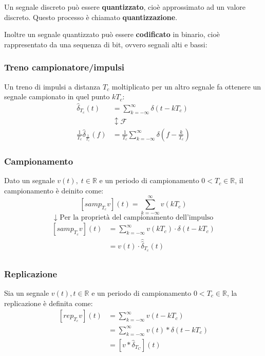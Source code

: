\documentclass[a4paper]{article}
\begin{document}
\noindent
Un segnale discreto può essere \textbf{quantizzato}, cioè approssimato ad un valore
discreto. Questo processo è chiamato \textbf{quantizzazione}.

Inoltre un segnale quantizzato può essere \textbf{codificato} in binario, cioè rappresentato
da una sequenza di bit, ovvero segnali alti e bassi:
\label{16-01-D3}

\subsubsection{Treno campionatore/impulsi}
Un treno di impulsi a distanza \( T_c \) moltiplicato per un altro segnale fa ottenere
un segnale campionato in quel punto \( kT_c \):
\label{16-01-D4}
\[
  \begin{aligned}
    \hat{\delta}_{T_c}(t) &= \sum_{k = -\infty}^{\infty} \delta(t - kT_c)\\
                       &\updownarrow \mathcal{F}\\
    \frac{1}{T_c} \hat{\delta}_{\frac{1}{T_c}}(f) &= \frac{1}{T_c} \sum_{k = -\infty}^{\infty} \delta(f - \frac{k}{T_c})
  \end{aligned}
\] 

\subsubsection{Campionamento}
\begin{definition}
  Dato un segnale \( v(t), \; t \in \mathbb{R} \) e un periodo di campionamento 
  \( 0 < T_c \in \mathbb{R} \), il campionamento è deinito come:
  \[
    \left[ samp_{T_c} v \right](t) = \sum_{k = -\infty}^{\infty} v(kT_c)
  \] 
  \[
  \downarrow \text{ Per la proprietà del campionamento dell'impulso}
  \] 
  \[
    \begin{aligned}
      \left[ samp_{T_c} v \right](t) &= \sum_{k = -\infty}^{\infty} v(kT_c) \cdot \delta(t - kT_c)\\
                                     &= v(t) \cdot \hat{\hat{\delta}}_{T_c}(t)\\
    \end{aligned}
  \] 
  \label{16-01-D5}
\end{definition}

\subsubsection{Replicazione}
\begin{definition}
  Sia un segnale \( v(t), t \in \mathbb{R} \) e un periodo di campionamento \( 0 < T_c \in \mathbb{R} \),
  la replicazione è definita come:
  \[
    \begin{aligned}
      \left[ rep_{T_c} v \right](t) &= \sum_{k = -\infty}^{\infty} v(t - kT_c)\\
                                    &= \sum_{k = -\infty}^{\infty} v(t) \ast \delta(t - kT_c)\\
                                    &= \left[ v \ast \hat{\delta}_{T_C} \right](t)
    \end{aligned}
  \]
  \label{16-01-D6}
\end{definition}
\end{document}
